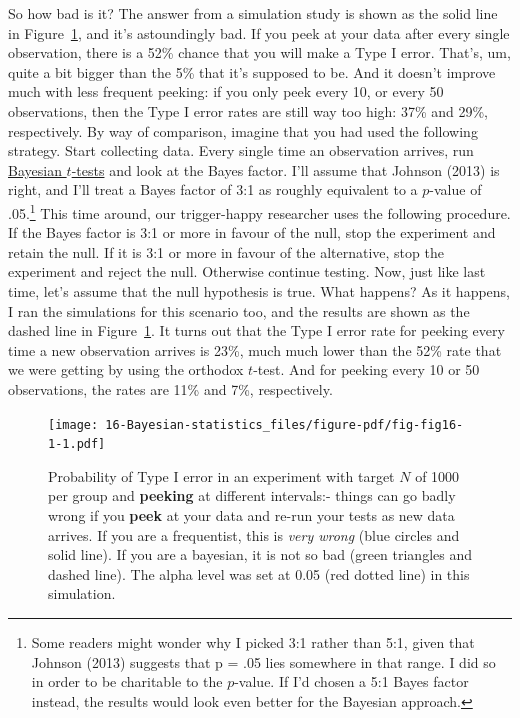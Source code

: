\documentclass[
  a4paper,
]{book}
\begin{document}
So how bad is it? The answer from a simulation study is shown as the
solid line in Figure~\ref{fig-fig16-1}, and it's astoundingly bad. If
you peek at your data after every single observation, there is a 52\%
chance that you will make a Type I error. That's, um, quite a bit bigger
than the 5\% that it's supposed to be. And it doesn't improve much with
less frequent peeking: if you only peek every 10, or every 50
observations, then the Type I error rates are still way too high: 37\%
and 29\%, respectively. By way of comparison, imagine that you had used
the following strategy. Start collecting data. Every single time an
observation arrives, run \protect\hyperlink{bayesian-t-tests}{Bayesian
\(t\)-tests} and look at the Bayes factor. I'll assume that Johnson
(2013) is right, and I'll treat a Bayes factor of 3:1 as roughly
equivalent to a \(p\)-value of .05.\footnote{Some readers might wonder
  why I picked 3:1 rather than 5:1, given that Johnson (2013) suggests
  that p = .05 lies somewhere in that range. I did so in order to be
  charitable to the \(p\)-value. If I'd chosen a 5:1 Bayes factor
  instead, the results would look even better for the Bayesian approach.}
This time around, our trigger-happy researcher uses the following
procedure. If the Bayes factor is 3:1 or more in favour of the null,
stop the experiment and retain the null. If it is 3:1 or more in favour
of the alternative, stop the experiment and reject the null. Otherwise
continue testing. Now, just like last time, let's assume that the null
hypothesis is true. What happens? As it happens, I ran the simulations
for this scenario too, and the results are shown as the dashed line in
Figure~\ref{fig-fig16-1}. It turns out that the Type I error rate for
peeking every time a new observation arrives is 23\%, much much lower
than the 52\% rate that we were getting by using the orthodox
\(t\)-test. And for peeking every 10 or 50 observations, the rates are
11\% and 7\%, respectively.

\begin{figure}

\texttt{[image: 16-Bayesian-statistics\_files/figure-pdf/fig-fig16-1-1.pdf]} \hfill{}

\caption{\label{fig-fig16-1}Probability of Type I error in an experiment
with target \(N\) of 1000 per group and \textbf{peeking} at different
intervals:- things can go badly wrong if you \textbf{peek} at your data
and re-run your tests as new data arrives. If you are a frequentist,
this is \emph{very wrong} (blue circles and solid line). If you are a
bayesian, it is not so bad (green triangles and dashed line). The alpha
level was set at 0.05 (red dotted line) in this simulation.}

\end{figure}
\end{document}
